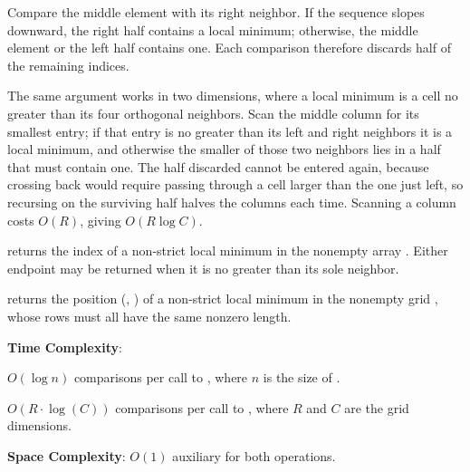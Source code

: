 Compare the middle element with its right neighbor. If the sequence slopes downward, the right half contains a local minimum; otherwise, the middle element or the left half contains one. Each comparison therefore discards half of the remaining indices.

The same argument works in two dimensions, where a local minimum is a cell no greater than its four orthogonal neighbors. Scan the middle column for its smallest entry; if that entry is no greater than its left and right neighbors it is a local minimum, and otherwise the smaller of those two neighbors lies in a half that must contain one. The half discarded cannot be entered again, because crossing back would require passing through a cell larger than the one just left, so recursing on the surviving half halves the columns each time. Scanning a column costs $O(R)$, giving $O(R \log C)$.

\begin{compactitem}
  \item {} returns the index of a non-strict local minimum in the nonempty array . Either endpoint may be returned when it is no greater than its sole neighbor.
  \item {} returns the position (, ) of a non-strict local minimum in the nonempty grid , whose rows must all have the same nonzero length.
\end{compactitem}

\textbf{Time Complexity}:
\begin{compactitem}
  \item $O(\log n)$ comparisons per call to , where $n$ is the size of .
  \item $O(R \cdot \log\left(C\right))$ comparisons per call to , where $R$ and $C$ are the grid dimensions.
\end{compactitem}

\textbf{Space Complexity}: $O(1)$ auxiliary for both operations.

